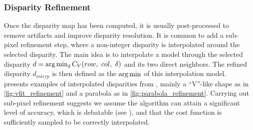 \subsubsection{Disparity Refinement}\label{sec:postprocess_disparity}
Once the disparity map has been computed, it is usually post-processed to remove artifacts and improve disparity resolution. It is common to add a sub-pixel refinement step, where a non-integer disparity is interpolated around the selected disparity. The main idea is to interpolate a model through the selected disparity $d=\operatorname*{arg\,min}_\delta C_V(row, ~col, ~\delta)$ and its two direct neighbors. The refined disparity $d_{interp}$ is then defined as the $\operatorname*{arg\,min}$ of this interpolation model.  presents examples of interpolated disparities from  \cite{haller_real-time_2010}, mainly a ``V''-like shape as in \ref{fig:vfit_refinement} and a parabola as in \ref{fig:parabola_refinement}. Carrying out sub-pixel refinement suggests we assume the algorithm can attain a significant level of accuracy, which is debatable (see ), and that the cost function is sufficiently sampled to be correctly interpolated.

